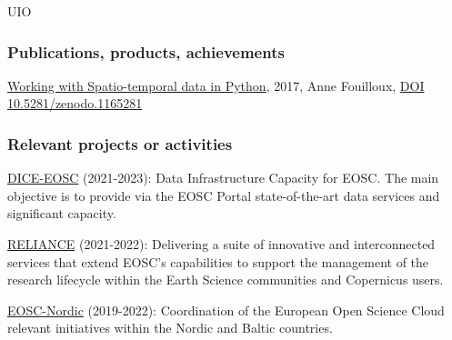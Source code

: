 \begin{sitedescription}{UIO}





%


\subsubsection*{Publications, products, achievements}

\begin{compactenum}

\item \href{https://annefou.github.io/metos_python/}{Working with Spatio-temporal data in Python}, 2017, Anne Fouilloux, \href{https://zenodo.org/badge/latestdoi/96184802}{DOI 10.5281/zenodo.1165281}
\end{compactenum}

\subsubsection*{Relevant projects or activities}

\begin{compactenum}


\item \href{https://www.dice-eosc.eu/}{DICE-EOSC}  (2021-2023):
Data Infrastructure Capacity for EOSC. The main objective is to provide via the EOSC Portal state-of-the-art data services and significant capacity.

\item \href{https://www.reliance-project.eu/}{RELIANCE}  (2021-2022):
Delivering a suite of innovative and interconnected services that extend EOSC’s capabilities to support the management of the research lifecycle within the Earth Science communities and Copernicus users.

\item \href{https://www.eosc-hub.eu}{EOSC-Nordic}  (2019-2022):
Coordination of the European Open Science Cloud relevant initiatives within the Nordic and Baltic countries.


\end{compactenum}
\end{sitedescription}
